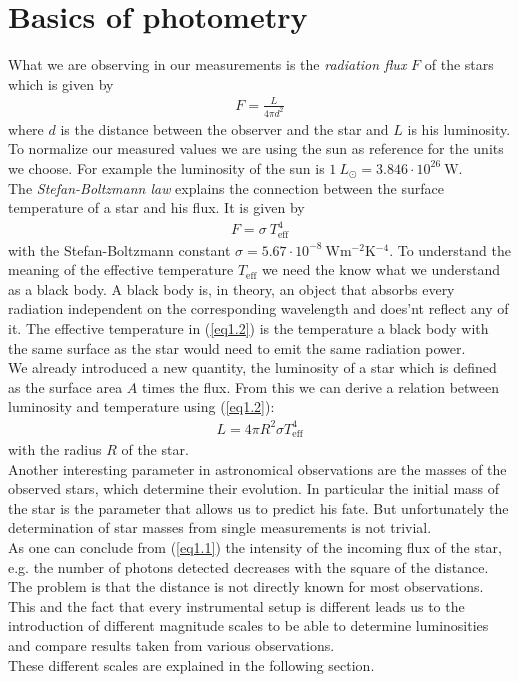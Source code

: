 \section{Basics of photometry}
What we are observing in our measurements is the \textit{radiation flux} $F$ of the stars which is given by
\begin{align}
	F = \frac{L}{4\pi d^2}\label{eq1.1}
\end{align}
where $d$ is the distance between the observer and the star and $L$ is his luminosity. \\
To normalize our measured values we are using the sun as reference for the units we choose. For example the luminosity of the sun is 
	$1 \ L_{\odot} = 3.846 \cdot 10^{26} \ \si{\watt}$. \\	
The \textit{Stefan-Boltzmann law} explains the connection between the surface temperature of a star and his flux. It is given by
\begin{align}
	F = \sigma \ T_{\text{eff}}^4\label{eq1.2}
\end{align}
with the Stefan-Boltzmann constant $\sigma = 5.67 \cdot 10^{-8} \ \si{\watt\meter^{-2}\kelvin^{-4}}$. To understand the meaning of the effective temperature $T_{\text{eff}}$ we need the know what we understand as a black body. A black body is, in theory, an object that absorbs every radiation independent on the corresponding wavelength and does'nt reflect any of it. The effective temperature in (\ref{eq1.2}) is the temperature a black body with the same surface as the star would need to emit the same radiation power. \\
We already introduced a new quantity, the luminosity of a star which is defined as the surface area $A$ times the flux. From this we can derive a relation between luminosity and temperature using (\ref{eq1.2}):
\begin{align}
	L = 4\pi R^2\sigma T_{\text{eff}}^4
\end{align}
with the radius $R$ of the star. \\
Another interesting parameter in astronomical observations are the masses of the observed stars, which determine their  evolution. In particular the initial mass of the star is the parameter that allows us to predict his fate. But unfortunately the determination of star masses from single measurements is not trivial. \\
As one can conclude from (\ref{eq1.1}) the intensity of the incoming flux of the star, e.g. the number of photons detected decreases with the square of the distance. The problem is that the distance is not directly known for most observations. This and the fact that every instrumental setup is different leads us to the introduction of different magnitude scales to be able to determine luminosities and compare results taken from various observations. \\
These different scales are explained in the following section.

